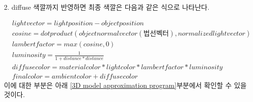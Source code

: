 \documentclass{gshs_thesis}
\theoremstyle{theorem}
\theoremstyle{lemma}
\theoremstyle{definition}
\begin{document}
2. diffuse 색깔까지 반영하면 최종 색깔은 다음과 같은 식으로 나타난다.

\begin{equation*}
	\begin{split}
		&light vector=light position-object position \\
		&cosine=dot product(object normal vector(법선벡터),normalized light vector) \\
		&lambert factor=max(cosine,0) \\
		&luminosity=\frac{1}{1+distance*distance} \\
		&diffuse color=material color*light color*lambert factor* luminosity \\
		&final color=ambient color+diffuse color
	\end{split}
\end{equation*}
이에 대한 부분은 아래 \cref{3D model approximation program}부분에서 확인할 수 있을 것이다.
\end{document}
